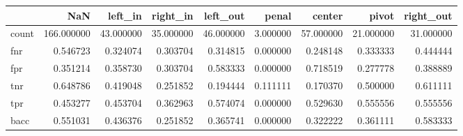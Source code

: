 \begin{tabular}{lrrrrrrrr}
\toprule
{} &         NaN &    left\_in &   right\_in &   left\_out &     penal &     center &      pivot &  right\_out \\
\midrule
count &  166.000000 &  43.000000 &  35.000000 &  46.000000 &  3.000000 &  57.000000 &  21.000000 &  31.000000 \\
fnr   &    0.546723 &   0.324074 &   0.303704 &   0.314815 &  0.000000 &   0.248148 &   0.333333 &   0.444444 \\
fpr   &    0.351214 &   0.358730 &   0.303704 &   0.583333 &  0.000000 &   0.718519 &   0.277778 &   0.388889 \\
tnr   &    0.648786 &   0.419048 &   0.251852 &   0.194444 &  0.111111 &   0.170370 &   0.500000 &   0.611111 \\
tpr   &    0.453277 &   0.453704 &   0.362963 &   0.574074 &  0.000000 &   0.529630 &   0.555556 &   0.555556 \\
bacc  &    0.551031 &   0.436376 &   0.251852 &   0.365741 &  0.000000 &   0.322222 &   0.361111 &   0.583333 \\
\bottomrule
\end{tabular}
